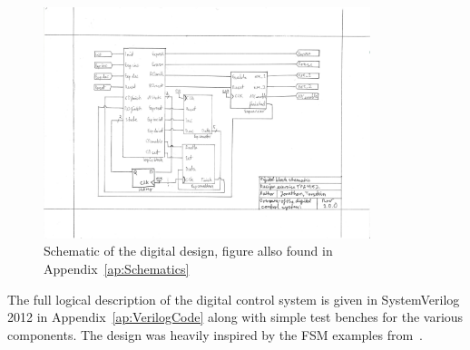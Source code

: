 \begin{figure}[htbp]
  \centering
  \includegraphics[width=0.85\textwidth]{figures/SchematicDigital}
  \caption{Schematic of the digital design, figure allso found in Appendix~\ref{ap:Schematics}}
  \label{fig:digschematic}
\end{figure}

The full logical description of the digital control system is given in SystemVerilog 2012 in Appendix~\ref{ap:VerilogCode} along with simple test benches for the various components.
The design was heavily inspired by the FSM examples from~\cite{DigitalBook}.